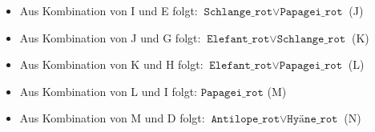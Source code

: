 \documentclass[a4paper,draft=false,oneside,12pt,ngerman]{scrreprt}
\begin{document}
\begin{itemize}
    \item Aus Kombination von I und E folgt: $ \texttt{Schlange\_rot} \lor \texttt{Papagei\_rot} $ (J)
    \item Aus Kombination von J und G folgt: $ \texttt{Elefant\_rot} \lor \texttt{Schlange\_rot} $ (K)
    \item Aus Kombination von K und H folgt: $ \texttt{Elefant\_rot} \lor \texttt{Papagei\_rot} $ (L)
    \item Aus Kombination von L und I folgt: $ \texttt{Papagei\_rot} $ (M)
    \item Aus Kombination von M und D folgt: $ \texttt{Antilope\_rot} \lor \texttt{Hyäne\_rot} $ (N)
\end{itemize}


\cleardoublepage{}
\renewcommand*{\chapterpagestyle}{scrheadings}
\renewcommand*{\indexpagestyle}{scrheadings}
\end{document}
